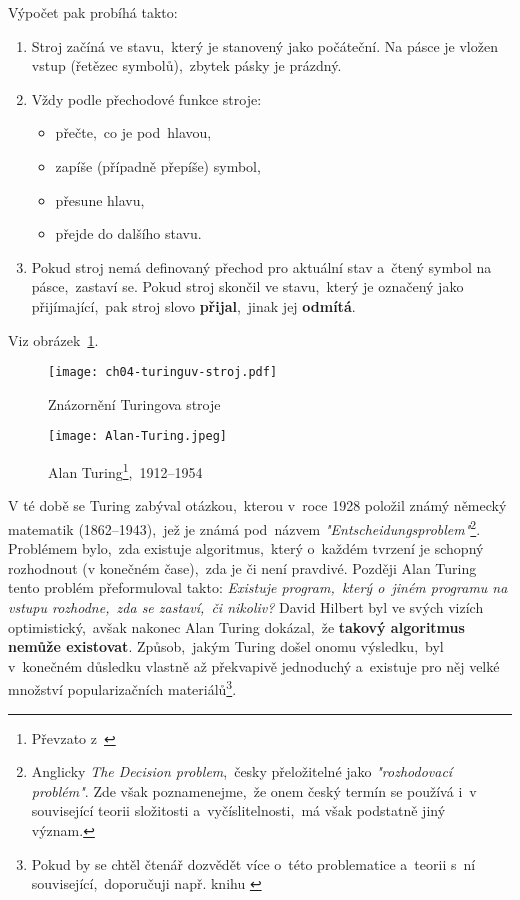 Výpočet pak probíhá takto:
\begin{enumerate}
    \item Stroj začíná ve stavu,~který je stanovený jako počáteční. Na pásce je vložen vstup (řetězec symbolů),~zbytek pásky je prázdný.
    \item Vždy podle přechodové funkce stroje:
    \begin{itemize}
        \item přečte,~co je pod~hlavou,
        \item zapíše (případně přepíše) symbol,
        \item přesune hlavu,
        \item přejde do dalšího stavu.
    \end{itemize}
    \item Pokud stroj nemá definovaný přechod pro aktuální stav a~čtený symbol na pásce,~zastaví se. Pokud stroj skončil ve stavu,~který je označený jako přijímající,~pak stroj slovo \textbf{přijal},~jinak jej \textbf{odmítá}.
\end{enumerate}
Viz obrázek~\ref{fig:turinguv-stroj}.
\begin{figure}[h]
    \centering
    \texttt{[image: ch04-turinguv-stroj.pdf]}
    \caption{Znázornění Turingova stroje}
    \label{fig:turinguv-stroj}
\end{figure}
\begin{figure}[h]
    \centering
    \texttt{[image: Alan-Turing.jpeg]}
    \caption[Alan Turing,~1871--1956]{Alan Turing\footnote{Převzato z~\cite{OConnorTuring2025}},~1912--1954}
    \label{fig:alan-turing}
\end{figure}
V té době se Turing zabýval otázkou,~kterou v~roce 1928 položil známý německý matematik  (1862--1943),~jež je známá pod~názvem \emph{"Entscheidungsproblem"}\footnote{Anglicky \emph{The Decision problem},~česky přeložitelné jako \emph{"rozhodovací problém"}. Zde však poznamenejme,~že onem český termín se používá i~v související teorii složitosti a~vyčíslitelnosti,~má však podstatně jiný význam.}. Problémem bylo,~zda existuje algoritmus,~který o~každém tvrzení je schopný rozhodnout (v konečném čase),~zda je či není pravdivé. Později Alan Turing tento problém přeformuloval takto: \emph{Existuje program,~který o~jiném programu na vstupu rozhodne,~zda se zastaví,~či nikoliv?} David Hilbert byl ve svých vizích optimistický,~avšak nakonec Alan Turing dokázal,~že \textbf{takový algoritmus nemůže existovat}. Způsob,~jakým Turing došel onomu výsledku,~byl v~konečném důsledku vlastně až překvapivě jednoduchý a~existuje pro něj velké množství popularizačních materiálů\footnote{Pokud by se chtěl čtenář dozvědět více o~této problematice a~teorii s~ní související,~doporučuji např. knihu \cite{Motwani2003}}.
